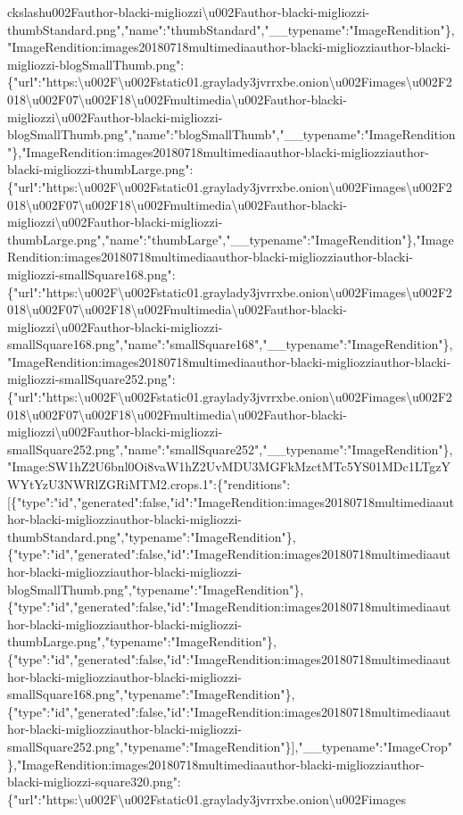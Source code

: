 ckslash{}u002Fauthor-blacki-migliozzi\textbackslash{}u002Fauthor-blacki-migliozzi-thumbStandard.png","name":"thumbStandard","\_\_typename":"ImageRendition"\},"ImageRendition:images20180718multimediaauthor-blacki-migliozziauthor-blacki-migliozzi-blogSmallThumb.png":\{"url":"https:\textbackslash{}u002F\textbackslash{}u002Fstatic01.graylady3jvrrxbe.onion\textbackslash{}u002Fimages\textbackslash{}u002F2018\textbackslash{}u002F07\textbackslash{}u002F18\textbackslash{}u002Fmultimedia\textbackslash{}u002Fauthor-blacki-migliozzi\textbackslash{}u002Fauthor-blacki-migliozzi-blogSmallThumb.png","name":"blogSmallThumb","\_\_typename":"ImageRendition"\},"ImageRendition:images20180718multimediaauthor-blacki-migliozziauthor-blacki-migliozzi-thumbLarge.png":\{"url":"https:\textbackslash{}u002F\textbackslash{}u002Fstatic01.graylady3jvrrxbe.onion\textbackslash{}u002Fimages\textbackslash{}u002F2018\textbackslash{}u002F07\textbackslash{}u002F18\textbackslash{}u002Fmultimedia\textbackslash{}u002Fauthor-blacki-migliozzi\textbackslash{}u002Fauthor-blacki-migliozzi-thumbLarge.png","name":"thumbLarge","\_\_typename":"ImageRendition"\},"ImageRendition:images20180718multimediaauthor-blacki-migliozziauthor-blacki-migliozzi-smallSquare168.png":\{"url":"https:\textbackslash{}u002F\textbackslash{}u002Fstatic01.graylady3jvrrxbe.onion\textbackslash{}u002Fimages\textbackslash{}u002F2018\textbackslash{}u002F07\textbackslash{}u002F18\textbackslash{}u002Fmultimedia\textbackslash{}u002Fauthor-blacki-migliozzi\textbackslash{}u002Fauthor-blacki-migliozzi-smallSquare168.png","name":"smallSquare168","\_\_typename":"ImageRendition"\},"ImageRendition:images20180718multimediaauthor-blacki-migliozziauthor-blacki-migliozzi-smallSquare252.png":\{"url":"https:\textbackslash{}u002F\textbackslash{}u002Fstatic01.graylady3jvrrxbe.onion\textbackslash{}u002Fimages\textbackslash{}u002F2018\textbackslash{}u002F07\textbackslash{}u002F18\textbackslash{}u002Fmultimedia\textbackslash{}u002Fauthor-blacki-migliozzi\textbackslash{}u002Fauthor-blacki-migliozzi-smallSquare252.png","name":"smallSquare252","\_\_typename":"ImageRendition"\},"Image:SW1hZ2U6bnl0Oi8vaW1hZ2UvMDU3MGFkMzctMTc5YS01MDc1LTgzYWYtYzU3NWRlZGRiMTM2.crops.1":\{"renditions":{[}\{"type":"id","generated":false,"id":"ImageRendition:images20180718multimediaauthor-blacki-migliozziauthor-blacki-migliozzi-thumbStandard.png","typename":"ImageRendition"\},\{"type":"id","generated":false,"id":"ImageRendition:images20180718multimediaauthor-blacki-migliozziauthor-blacki-migliozzi-blogSmallThumb.png","typename":"ImageRendition"\},\{"type":"id","generated":false,"id":"ImageRendition:images20180718multimediaauthor-blacki-migliozziauthor-blacki-migliozzi-thumbLarge.png","typename":"ImageRendition"\},\{"type":"id","generated":false,"id":"ImageRendition:images20180718multimediaauthor-blacki-migliozziauthor-blacki-migliozzi-smallSquare168.png","typename":"ImageRendition"\},\{"type":"id","generated":false,"id":"ImageRendition:images20180718multimediaauthor-blacki-migliozziauthor-blacki-migliozzi-smallSquare252.png","typename":"ImageRendition"\}{]},"\_\_typename":"ImageCrop"\},"ImageRendition:images20180718multimediaauthor-blacki-migliozziauthor-blacki-migliozzi-square320.png":\{"url":"https:\textbackslash{}u002F\textbackslash{}u002Fstatic01.graylady3jvrrxbe.onion\textbackslash{}u002Fimages\text